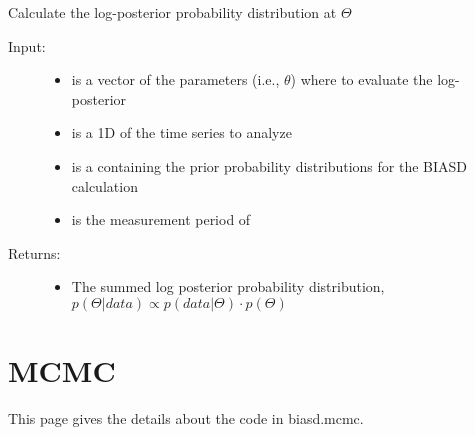 \documentclass[letterpaper,10pt,english]{sphinxmanual}
\begin{document}
\begin{fulllineitems}
\label{code_likelihood:likelihood.log_posterior}
Calculate the log-posterior probability distribution at \(\Theta\)
\begin{description}
\item[{Input:}] \leavevmode\begin{itemize}
\item {} 
 is a vector of the parameters (i.e., \(\theta\)) where to evaluate the log-posterior

\item {} 
 is a 1D  of the time series to analyze

\item {} 
 is a  containing the prior probability distributions for the BIASD calculation

\item {} 
 is the measurement period of 

\end{itemize}

\item[{Returns:}] \leavevmode\begin{itemize}
\item {} 
The summed log posterior probability distribution, \(p(\Theta \vert data) \propto p(data \vert \Theta) \cdot p(\Theta)\)

\end{itemize}

\end{description}

\end{fulllineitems}



\section{MCMC}
\label{code_mcmc:code-mcmc}\label{code_mcmc::doc}\label{code_mcmc:mcmc}
This page gives the details about the code in biasd.mcmc.
\end{document}
